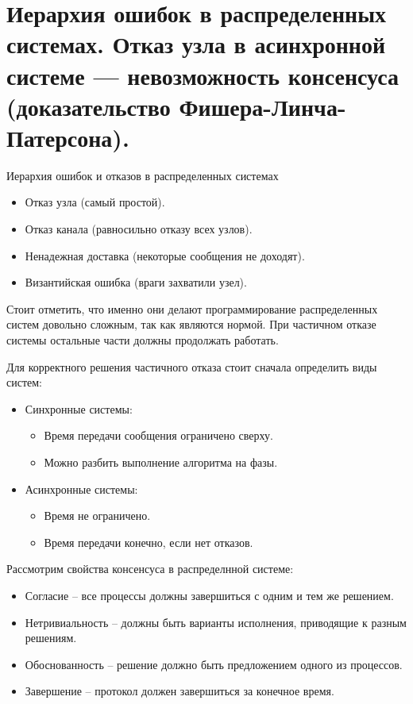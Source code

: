 \section{Иерархия ошибок в распределенных системах. Отказ узла в асинхронной системе --- невозможность консенсуса (доказательство Фишера-Линча-Патерсона).}
 
\begin{definition} Иерархия ошибок и отказов в распределенных системах
    \begin{itemize}
        \item Отказ узла (самый простой).
        \item Отказ канала (равносильно отказу всех узлов).
        \item Ненадежная доставка (некоторые сообщения не доходят).
        \item Византийская ошибка (враги захватили узел).
    \end{itemize}
\end{definition}
 
\begin{remark}
Стоит отметить, что именно они делают программирование распределенных систем довольно 
сложным, так как являются нормой. При частичном отказе системы остальные части должны 
продолжать работать.
 
Для корректного решения частичного отказа стоит сначала определить виды систем:
\begin{itemize}
    \item Синхронные системы:
        \begin{itemize}
            \item Время передачи сообщения ограничено сверху.
            \item Можно разбить выполнение алгоритма на фазы.
        \end{itemize}
    \item Асинхронные системы:
        \begin{itemize}
            \item Время не ограничено.
            \item Время передачи конечно, если нет отказов.
        \end{itemize}
\end{itemize}
\end{remark}
 
\begin{definition} Рассмотрим свойства консенсуса в распределнной системе:
    \begin{itemize}
        \item Согласие -- все процессы должны завершиться с одним и тем же решением.
        \item Нетривиальность -- должны быть варианты исполнения, приводящие к разным решениям.
        \item Обоснованность -- решение должно быть предложением одного из процессов.
        \item Завершение -- протокол должен завершиться за конечное время.
    \end{itemize} 
\end{definition}


